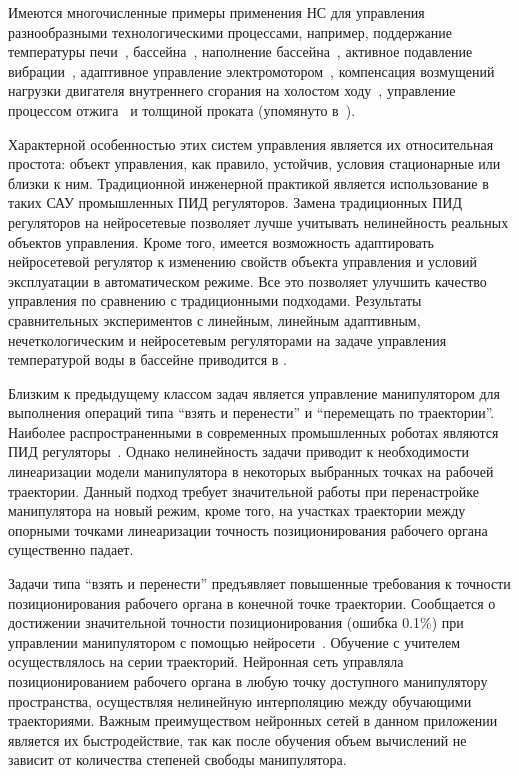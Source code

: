 Имеются многочисленные примеры применения НС для управления
разнообразными технологическими процессами, например, поддержание
температуры печи~\cite{sigom00}, бассейна~\cite{khomyu96}, наполнение
бассейна~\cite{kav96}, активное подавление вибрации~\cite{bouchard01},
адаптивное управление электромотором~\cite{linwaihong01}, компенсация
возмущений нагрузки двигателя внутреннего сгорания на холостом
ходу~\cite{gorfeld96,tukin01}, управление процессом
отжига~\cite{pican95} и толщиной проката (упомянуто
в~\cite{bondlog97}).

Характерной особенностью этих систем управления является их
относительная простота: объект управления, как правило, устойчив,
условия стационарные или близки к ним.  Традиционной инженерной
практикой является использование в таких САУ промышленных ПИД
регуляторов.  Замена традиционных ПИД регуляторов на нейросетевые
позволяет лучше учитывать нелинейность реальных объектов управления.
Кроме того, имеется возможность адаптировать нейросетевой регулятор к
изменению свойств объекта управления и условий эксплуатации в
автоматическом режиме.  Все это позволяет улучшить качество управления
по сравнению с традиционными подходами.  Результаты сравнительных
экспериментов с линейным, линейным адаптивным, нечеткологическим и
нейросетевым регуляторами на задаче управления температурой воды в
бассейне приводится в \cite{khomyu96}.


Близким к предыдущему классом задач является управление манипулятором
для выполнения операций типа ``взять и перенести'' и ``перемещать по
траектории''.  Наиболее распространенными в современных промышленных
роботах являются ПИД регуляторы~\cite{chenmills97}.  Однако
нелинейность задачи приводит к необходимости линеаризации модели
манипулятора в некоторых выбранных точках на рабочей траектории.
Данный подход требует значительной работы при перенастройке
манипулятора на новый режим, кроме того, на участках траектории между
опорными точками линеаризации точность позиционирования рабочего
органа существенно падает.

Задачи типа ``взять и перенести'' предъявляет повышенные требования к
точности позиционирования рабочего органа в конечной точке траектории.
Сообщается о достижении значительной точности позиционирования (ошибка
0.1\%) при управлении манипулятором с помощью
нейросети~\cite{bondlog97}.  Обучение с учителем осуществлялось на
серии траекторий.  Нейронная сеть управляла позиционированием рабочего
органа в любую точку доступного манипулятору пространства, осуществляя
нелинейную интерполяцию между обучающими траекториями.  Важным
преимуществом нейронных сетей в данном приложении является их
быстродействие, так как после обучения объем вычислений не зависит от
количества степеней свободы манипулятора.


